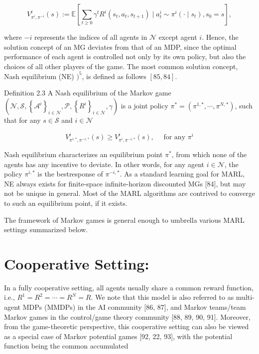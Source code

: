 \documentclass[10pt]{article}
\begin{document}
\[
V_{\pi^{i}, \pi^{-i}}^{i}(s):=\mathbb{E}\left[\sum_{t \geq 0} \gamma^{t} R^{i}\left(s_{t}, a_{t}, s_{t+1}\right) \mid a_{t}^{i} \sim \pi^{i}\left(\cdot \mid s_{t}\right), s_{0}=s\right],
\]

where $-i$ represents the indices of all agents in $\mathcal{N}$ except agent $i$. Hence, the solution concept of an MG deviates from that of an MDP, since the optimal performance of each agent is controlled not only by its own policy, but also the choices of all other players of the game. The most common solution concept, Nash equilibrium (NE) $)^{5}$, is defined as follows $[85,84]$.

Definition 2.3 A Nash equilibrium of the Markov game $\left(\mathcal{N}, \mathcal{S},\left\{\mathcal{A}^{i}\right\}_{i \in \mathcal{N}}, \mathcal{P},\left\{R^{i}\right\}_{i \in \mathcal{N}}, \gamma\right)$ is a joint policy $\pi^{*}=\left(\pi^{1, *}, \cdots, \pi^{N, *}\right)$, such that for any $s \in \mathcal{S}$ and $i \in \mathcal{N}$

\[
V_{\pi^{i, *}, \pi^{-i, *}}^{i}(s) \geq V_{\pi^{i}, \pi^{-i, *}}^{i}(s), \quad \text { for any } \pi^{i}
\]

Nash equilibrium characterizes an equilibrium point $\pi^{*}$, from which none of the agents has any incentive to deviate. In other words, for any agent $i \in \mathcal{N}$, the policy $\pi^{i, *}$ is the bestresponse of $\pi^{-i, *}$. As a standard learning goal for MARL, NE always exists for finite-space infinite-horizon discounted MGs [84], but may not be unique in general. Most of the MARL algorithms are contrived to converge to such an equilibrium point, if it exists.

The framework of Markov games is general enough to umbrella various MARL settings summarized below.

\section{Cooperative Setting:}
In a fully cooperative setting, all agents usually share a common reward function, i.e., $R^{1}=R^{2}=\cdots=R^{N}=R$. We note that this model is also referred to as multi-agent MDPs (MMDPs) in the AI community [86, 87], and Markov teams/team Markov games in the control/game theory community [88, 89, 90, 91]. Moreover, from the game-theoretic perspective, this cooperative setting can also be viewed as a special case of Markov potential games [92, 22, 93], with the potential function being the common accumulated
\end{document}
